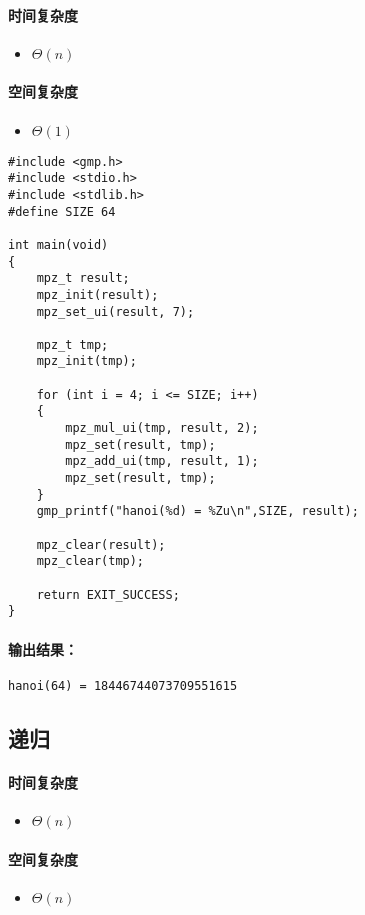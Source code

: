 \documentclass[UTF8]{ctexart}
\begin{document}
\paragraph{时间复杂度}
\begin{itemize}
	\item $\Theta(n)$
\end{itemize}
\paragraph{空间复杂度}
\begin{itemize}
	\item $\Theta(1)$
\end{itemize}
\begin{lstlisting}
#include <gmp.h>
#include <stdio.h>
#include <stdlib.h>
#define SIZE 64

int main(void)
{
	mpz_t result;
	mpz_init(result);
	mpz_set_ui(result, 7);

	mpz_t tmp;
	mpz_init(tmp);

	for (int i = 4; i <= SIZE; i++)
	{
		mpz_mul_ui(tmp, result, 2);
		mpz_set(result, tmp);
		mpz_add_ui(tmp, result, 1);
		mpz_set(result, tmp);
	}
	gmp_printf("hanoi(%d) = %Zu\n",SIZE, result);

	mpz_clear(result);
	mpz_clear(tmp);

	return EXIT_SUCCESS;
}
\end{lstlisting}
\paragraph{输出结果：}
\begin{lstlisting}
hanoi(64) = 18446744073709551615
\end{lstlisting}
\subsection{递归}
\paragraph{时间复杂度}
\begin{itemize}
	\item $\Theta(n)$
\end{itemize}
\paragraph{空间复杂度}
\begin{itemize}
	\item $\Theta(n)$
\end{itemize}
\end{document}
